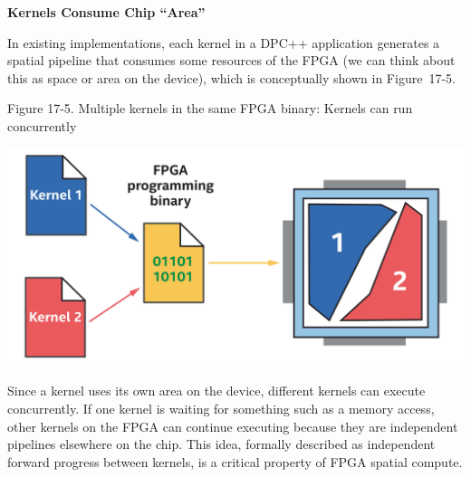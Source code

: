 \hspace*{\fill} \par %
\textbf{Kernels Consume Chip “Area”}

In existing implementations, each kernel in a DPC++ application generates a spatial pipeline that consumes some resources of the FPGA (we can think about this as space or area on the device), which is conceptually shown in Figure 17-5.\par

\hspace*{\fill} \par %
Figure 17-5. Multiple kernels in the same FPGA binary: Kernels can run concurrently
\begin{center}
	\includegraphics[width=1.0\textwidth]{content/chapter-17/images/6}
\end{center}

Since a kernel uses its own area on the device, different kernels can execute concurrently. If one kernel is waiting for something such as a memory access, other kernels on the FPGA can continue executing because they are independent pipelines elsewhere on the chip. This idea, formally described as independent forward progress between kernels, is a critical property of FPGA spatial compute.\par







